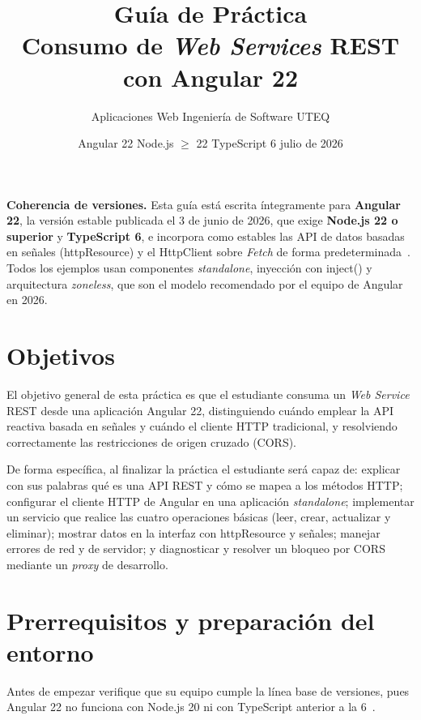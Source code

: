 \documentclass[11pt,a4paper]{article}
\title{\vspace{-1.2cm}\textbf{\color{ngred}Guía de Práctica}\\[2pt]
	\Large Consumo de \emph{Web Services} REST con Angular 22}
\author{Aplicaciones Web \textbar{} Ingeniería de Software \textbar{} UTEQ}
\date{Angular 22 \textbullet{} Node.js $\geq$ 22 \textbullet{} TypeScript 6 \textbullet{} julio de 2026}
\newcommand{\code}[1]{{\ttfamily\color{ngdark}#1}}
\begin{document}
\maketitle

\begin{nota}
	\textbf{Coherencia de versiones.} Esta guía está escrita íntegramente para \textbf{Angular 22}, la versión estable publicada el 3 de junio de 2026, que exige \textbf{Node.js 22 o superior} y \textbf{TypeScript 6}, e incorpora como estables las API de datos basadas en señales (\code{httpResource}) y el \code{HttpClient} sobre \emph{Fetch} de forma predeterminada~\cite{angularv22,angularversions,angularhttp}. Todos los ejemplos usan componentes \emph{standalone}, inyección con \code{inject()} y arquitectura \emph{zoneless}, que son el modelo recomendado por el equipo de Angular en 2026.
\end{nota}

\section{Objetivos}

El objetivo general de esta práctica es que el estudiante consuma un \emph{Web Service} REST desde una aplicación Angular 22, distinguiendo cuándo emplear la API reactiva basada en señales y cuándo el cliente HTTP tradicional, y resolviendo correctamente las restricciones de origen cruzado (CORS).

De forma específica, al finalizar la práctica el estudiante será capaz de: explicar con sus palabras qué es una API REST y cómo se mapea a los métodos HTTP; configurar el cliente HTTP de Angular en una aplicación \emph{standalone}; implementar un servicio que realice las cuatro operaciones básicas (leer, crear, actualizar y eliminar); mostrar datos en la interfaz con \code{httpResource} y señales; manejar errores de red y de servidor; y diagnosticar y resolver un bloqueo por CORS mediante un \emph{proxy} de desarrollo.

\section{Prerrequisitos y preparación del entorno}

Antes de empezar verifique que su equipo cumple la línea base de versiones, pues Angular 22 no funciona con Node.js 20 ni con TypeScript anterior a la 6~\cite{angularversions}.
\end{document}
